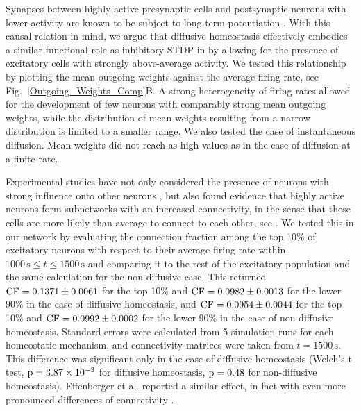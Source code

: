 \documentclass[10pt,letterpaper]{article}
\begin{document}
Synapses between highly active presynaptic cells and postsynaptic neurons with lower activity are known to be subject to long-term potentiation \cite{Sjoestroem_Syn_Plasticity_2001,Feldman_STDP_2012}. With this causal relation in mind, we argue that diffusive homeostasis effectively embodies a similar functional role as inhibitory STDP in \cite{Effenberger_2015} by allowing for the presence of excitatory cells with strongly above-average activity. We tested this relationship by plotting the mean outgoing weights against the average firing rate, see Fig.~\ref{Outgoing_Weights_Comp}B. A strong heterogeneity of firing rates allowed for the development of few neurons with comparably strong mean outgoing weights, while the distribution of mean weights resulting from a narrow distribution is limited to a smaller range. We also tested the case of instantaneous diffusion. Mean weights did not reach as high values as in the case of diffusion at a finite rate.

Experimental studies have not only considered the presence of neurons with strong influence onto other neurons \cite{Eckmann_Leader_Neurons_2008}, but also found evidence that highly active neurons form subnetworks with an increased connectivity, in the sense that these cells are more likely than average to connect to each other, see \cite{Yassin_Subnetworks_2010}. We tested this in our network by evaluating the connection fraction among the top 10\% of excitatory neurons with respect to their average firing rate within $\mathrm{1000\,s} \leq t \leq \mathrm{1500\,s}$ and comparing it to the rest of the excitatory population and the same calculation for the non-diffusive case. This returned $\rm CF= 0.1371 \pm 0.0061$ for the top 10\% and $\rm CF = 0.0982 \pm 0.0013$ for the lower 90\% in the case of diffusive homeostasis, and  $\rm CF = 0.0954 \pm 0.0044$ for the top 10\% and $\rm CF = 0.0992 \pm 0.0002$ for the lower 90\% in the case of non-diffusive homeostasis. Standard errors were calculated from 5 simulation runs for each homeostatic mechanism, and connectivity matrices were taken from $t = \mathrm{1500\,s}$. This difference was significant only in the case of diffusive homeostasis (Welch's t-test, $\rm p = 3.87 \times 10 ^ {-3}$ for diffusive homeostasis, $\rm p = 0.48$ for non-diffusive homeostasis). Effenberger et al. reported a similar effect, in fact with even more pronounced differences of connectivity \cite{Effenberger_2015}.
\end{document}
